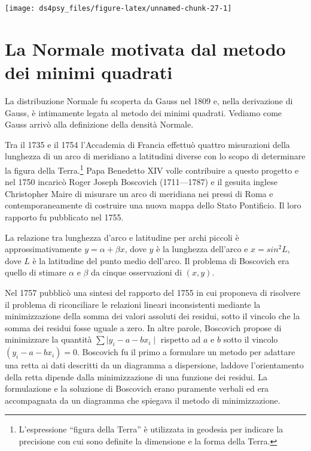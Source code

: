 \documentclass[
  11pt,
]{krantz}
\theoremstyle{definition}
\theoremstyle{definition}
\theoremstyle{definition}
\theoremstyle{definition}
\theoremstyle{remark}
\begin{document}
\begin{center}\texttt{[image: ds4psy\_files/figure-latex/unnamed-chunk-27-1]} \end{center}

\hypertarget{gauss-normale}{%
\chapter{La Normale motivata dal metodo dei minimi quadrati}\label{gauss-normale}}

La distribuzione Normale fu scoperta da Gauss nel 1809 e, nella derivazione di Gauss, è intimamente legata al metodo dei minimi quadrati. Vediamo come Gauss arrivò alla definizione della densità Normale.

Tra il 1735 e il 1754 l'Accademia di Francia effettuò quattro misurazioni della lunghezza di un arco di meridiano a latitudini diverse con lo scopo di determinare la figura della Terra.\footnote{L'espressione ``figura della Terra'' è utilizzata in geodesia per indicare la precisione con cui sono definite la dimensione e la forma della Terra.} Papa Benedetto XIV volle contribuire a questo progetto e nel 1750 incaricò Roger Joseph Boscovich (1711---1787) e il gesuita inglese Christopher Maire di misurare un arco di meridiana nei pressi di Roma e contemporaneamente di costruire una nuova mappa dello Stato Pontificio. Il loro rapporto fu pubblicato nel 1755.

La relazione tra lunghezza d'arco e latitudine per archi piccoli è approssimativamente \(y = \alpha + \beta x\), dove \(y\) è la lunghezza dell'arco e \(x = sin^2L\), dove \(L\) è la latitudine del punto medio dell'arco. Il problema di Boscovich era quello di stimare \(\alpha\) e \(\beta\) da cinque osservazioni di \((x, y)\).

Nel 1757 pubblicò una sintesi del rapporto del 1755 in cui proponeva di risolvere il problema di riconciliare le relazioni lineari inconsistenti mediante la minimizzazione della somma dei valori assoluti dei residui, sotto il vincolo che la somma dei residui fosse uguale a zero. In altre parole, Boscovich propose di minimizzare la quantità \(\sum \mid y_i - a - b x_i \mid\) rispetto ad \(a\) e \(b\) sotto il vincolo \((y_i - a - b x_i) = 0\). Boscovich fu il primo a formulare un metodo per adattare una retta ai dati descritti da un diagramma a dispersione, laddove l'orientamento della retta dipende dalla minimizzazione di una funzione dei residui. La formulazione e la soluzione di Boscovich erano puramente verbali ed era accompagnata da un diagramma che spiegava il metodo di minimizzazione.
\end{document}
